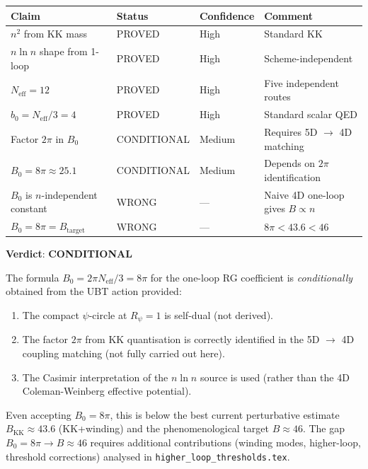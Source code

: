 \documentclass[11pt,a4paper]{article}
\begin{document}
\begin{center}
\begin{tabular}{llll}
\hline
Claim & Status & Confidence & Comment \\\hline
$n^2$ from KK mass & PROVED & High & Standard KK \\
$n\ln n$ shape from 1-loop & PROVED & High & Scheme-independent \\
$N_\mathrm{eff} = 12$ & PROVED & High & Five independent routes \\
$b_0 = N_\mathrm{eff}/3 = 4$ & PROVED & High & Standard scalar QED \\
Factor $2\pi$ in $B_0$ & CONDITIONAL & Medium & Requires 5D $\to$ 4D matching \\
$B_0 = 8\pi \approx 25.1$ & CONDITIONAL & Medium & Depends on $2\pi$ identification \\
$B_0$ is $n$-independent constant & WRONG & — & Naive 4D one-loop gives $B \propto n$ \\
$B_0 = 8\pi = B_\mathrm{target}$ & WRONG & — & $8\pi < 43.6 < 46$ \\\hline
\end{tabular}
\end{center}

\bigskip
\noindent\textbf{Verdict}: \textbf{CONDITIONAL}

The formula $B_0 = 2\pi N_\mathrm{eff}/3 = 8\pi$ for the one-loop RG coefficient
is \emph{conditionally} obtained from the UBT action provided:
\begin{enumerate}
  \item The compact $\psi$-circle at $R_\psi = 1$ is self-dual (not derived).
  \item The factor $2\pi$ from KK quantisation is correctly identified in the
        5D $\to$ 4D coupling matching (not fully carried out here).
  \item The Casimir interpretation of the $n\ln n$ source is used
        (rather than the 4D Coleman-Weinberg effective potential).
\end{enumerate}

Even accepting $B_0 = 8\pi$, this is below the best current perturbative estimate
$B_\mathrm{KK} \approx 43.6$ (KK+winding) and the phenomenological target $B \approx 46$.
The gap $B_0 = 8\pi \to B \approx 46$ requires additional contributions
(winding modes, higher-loop, threshold corrections) analysed in
\texttt{higher\_loop\_thresholds.tex}.
\end{document}

